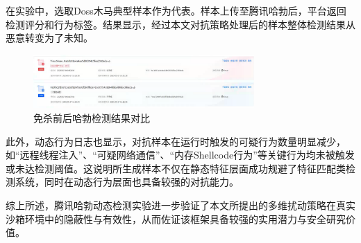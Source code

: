 
在实验中，选取Doss木马典型样本作为代表。样本上传至腾讯哈勃后，平台返回检测评分和行为标签。结果显示，经过本文对抗策略处理后的样本整体检测结果从恶意转变为了未知。


\begin{figure}[hbt]
	\centering
	\includegraphics[width=0.75\textwidth]{figures/5.2}
	\caption{免杀前后哈勃检测结果对比}\label{fig:5.2}
\end{figure}

此外，动态行为日志也显示，对抗样本在运行时触发的可疑行为数量明显减少，如“远程线程注入”、“可疑网络通信”、“内存Shellcode行为”等关键行为均未被触发或未达检测阈值。这说明所生成样本不仅在静态特征层面成功规避了特征匹配类检测系统，同时在动态行为层面也具备较强的对抗能力。


综上所述，腾讯哈勃动态检测实验进一步验证了本文所提出的多维扰动策略在真实沙箱环境中的隐蔽性与有效性，从而佐证该框架具备较强的实用潜力与安全研究价值。


